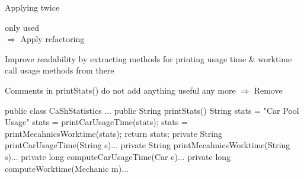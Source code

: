 Applying  twice
\begin{defBox}[title=Observation 1]
     only used \\
    $\Rightarrow$ Apply refactoring 
\end{defBox}
\begin{defBox}[title=Observation 2]
    Improve readability by extracting methods for printing usage time \& worktime  call usage methods from there
\end{defBox}
\begin{defBox}[title=Observation 3]
    Comments in printStats() do not add anything useful any more $\Rightarrow$ Remove
\end{defBox}
\begin{codeBlock}{}
    public class CaShStatistics{
        ...
        public String printStats(){
            String stats = "Car Pool Usage\n"
            stats = printCarUsageTime(stats);
            stats = printMecahnicsWorktime(stats);
            return stats;
        }
        private String printCarUsageTime(String s){...}
        private String printMecahnicsWorktime(String s){...}
        private long computeCarUsageTime(Car c){...}
        private long computeWorktime(Mechanic m){...}
    }
\end{codeBlock}
